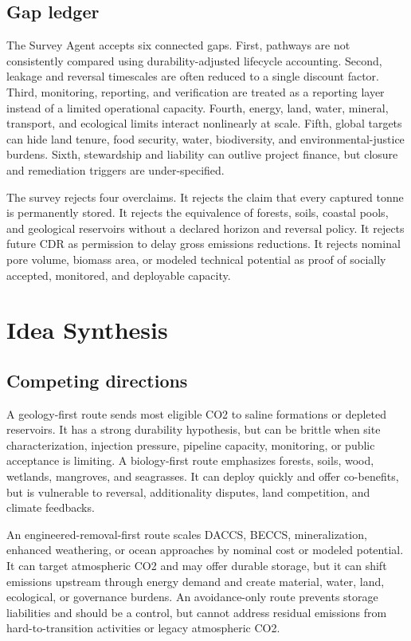 \documentclass[conference]{IEEEtran}
\begin{document}
\subsection{Gap ledger}
The Survey Agent accepts six connected gaps. First, pathways are not consistently compared using durability-adjusted lifecycle accounting. Second, leakage and reversal timescales are often reduced to a single discount factor. Third, monitoring, reporting, and verification are treated as a reporting layer instead of a limited operational capacity. Fourth, energy, land, water, mineral, transport, and ecological limits interact nonlinearly at scale. Fifth, global targets can hide land tenure, food security, water, biodiversity, and environmental-justice burdens. Sixth, stewardship and liability can outlive project finance, but closure and remediation triggers are under-specified.

The survey rejects four overclaims. It rejects the claim that every captured tonne is permanently stored. It rejects the equivalence of forests, soils, coastal pools, and geological reservoirs without a declared horizon and reversal policy. It rejects future CDR as permission to delay gross emissions reductions. It rejects nominal pore volume, biomass area, or modeled technical potential as proof of socially accepted, monitored, and deployable capacity.

\section{Idea Synthesis}
\subsection{Competing directions}
A geology-first route sends most eligible CO2 to saline formations or depleted reservoirs. It has a strong durability hypothesis, but can be brittle when site characterization, injection pressure, pipeline capacity, monitoring, or public acceptance is limiting. A biology-first route emphasizes forests, soils, wood, wetlands, mangroves, and seagrasses. It can deploy quickly and offer co-benefits, but is vulnerable to reversal, additionality disputes, land competition, and climate feedbacks.

An engineered-removal-first route scales DACCS, BECCS, mineralization, enhanced weathering, or ocean approaches by nominal cost or modeled potential. It can target atmospheric CO2 and may offer durable storage, but it can shift emissions upstream through energy demand and create material, water, land, ecological, or governance burdens. An avoidance-only route prevents storage liabilities and should be a control, but cannot address residual emissions from hard-to-transition activities or legacy atmospheric CO2.
\end{document}
